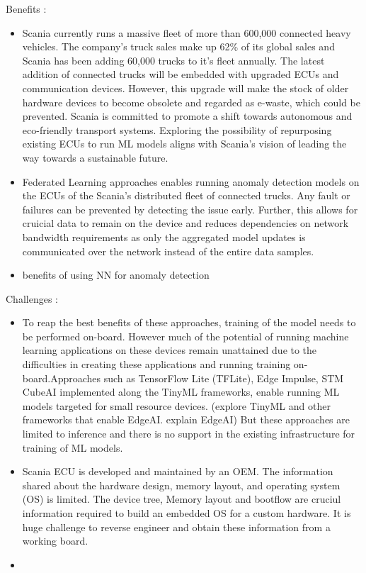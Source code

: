 Benefits :
\begin{itemize}
	\item Scania currently runs a massive fleet of more than 600,000 connected heavy vehicles. The company's truck sales make up 62\% of its global sales and Scania has been adding 60,000 trucks to it's fleet annually. The latest addition of connected trucks will be embedded with upgraded ECUs and communication devices. However, this upgrade will make the stock of older hardware devices to become obsolete and regarded as e-waste, which could be prevented. Scania is committed to promote a shift towards autonomous and eco-friendly transport systems. Exploring the possibility of repurposing existing ECUs to run ML models aligns with Scania's vision of leading the way towards a sustainable future. 
	\item Federated Learning approaches enables running anomaly detection models on the ECUs of the Scania's distributed fleet of connected trucks. Any fault or failures can be prevented by detecting the issue early. Further, this allows for cruicial data to remain on the device and reduces dependencies on network bandwidth requirements as only the aggregated model updates is communicated over the network instead of the entire data samples. 
	\item benefits of using NN for anomaly detection
\end{itemize}

Challenges :
\begin{itemize}
	\item To reap the best benefits of these approaches, training of the model needs to be performed on-board. However much of the potential of running machine learning applications on these devices remain unattained due to the difficulties in creating these applications and running training on-board.Approaches such as TensorFlow Lite (TFLite), Edge Impulse, STM CubeAI implemented along the TinyML frameworks, enable running ML models targeted for small resource devices. (explore TinyML and other frameworks that enable EdgeAI. explain EdgeAI)	But these approaches are limited to inference and there is no support in the existing infrastructure for training of ML models.
	\item Scania ECU is developed and maintained by an OEM. The information shared about the hardware design, memory layout, and operating system (OS) is limited. The device tree, Memory layout and bootflow are cruciul information required to build an embedded OS for a custom hardware. It is huge challenge to reverse engineer and obtain these information from a working board. 
	\item 
\end{itemize}


